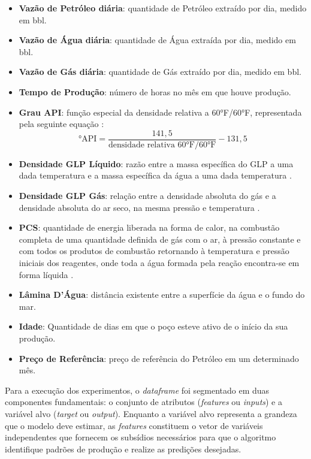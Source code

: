 \begin{itemize}
    \item \textbf{Vazão de Petróleo diária}: quantidade de Petróleo extraído por dia, medido em bbl.
    \item \textbf{Vazão de Água diária}: quantidade de Água extraída por dia, medido em bbl.
    \item \textbf{Vazão de Gás diária}: quantidade de Gás extraído por dia, medido em bbl.
    \item \textbf{Tempo de Produção}: número de horas no mês em que houve produção.
    \item \textbf{Grau API}: função especial da densidade relativa a 60°F/60°F, representada pela seguinte equação \cite{abnt7148}:
    \begin{equation*}
        \text{°API} = \frac{141,5}{\text{densidade relativa 60°F/60°F}} - 131,5
    \end{equation*}
    \item \textbf{Densidade \gls{GLP} Líquido}: razão entre a massa específica do \gls{GLP} a uma dada temperatura e a massa específica da água a uma dada temperatura \cite{abnt14065}.
    \item \textbf{Densidade \gls{GLP} Gás}: relação entre a densidade absoluta do gás e a densidade absoluta do ar seco, na mesma pressão e temperatura \cite{abnt15358}.
    \item \textbf{\gls{PCS}}: quantidade de energia liberada na forma de calor, na combustão completa de uma quantidade definida de gás com o ar, à pressão constante e com todos os produtos de combustão retornando à temperatura e pressão iniciais dos reagentes, onde toda a água formada pela reação encontra-se em forma líquida \cite{abnt15213}.
    \item \textbf{Lâmina D'Água}: distância existente entre a superfície da água e o fundo do mar.
    \item \textbf{Idade}: Quantidade de dias em que o poço esteve ativo de o início da sua produção.
    \item \textbf{Preço de Referência}: preço de referência do Petróleo em um determinado mês.
\end{itemize}

Para a execução dos experimentos, o \textit{dataframe} foi segmentado em duas componentes fundamentais: o conjunto de atributos (\textit{features} ou \textit{inputs}) e a variável alvo (\textit{target} ou \textit{output}). Enquanto a variável alvo representa a grandeza que o modelo deve estimar, as \textit{features} constituem o vetor de variáveis independentes que fornecem os subsídios necessários para que o algoritmo identifique padrões de produção e realize as predições desejadas.

